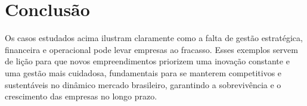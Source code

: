 \section*{Conclusão}
Os casos estudados acima ilustram claramente como a falta de gestão estratégica, financeira e operacional pode levar empresas ao fracasso. Esses exemplos servem de lição para que novos empreendimentos priorizem uma inovação constante e uma gestão mais cuidadosa, fundamentais para se manterem competitivos e sustentáveis no dinâmico mercado brasileiro, garantindo a sobrevivência e o crescimento das empresas no longo prazo.

